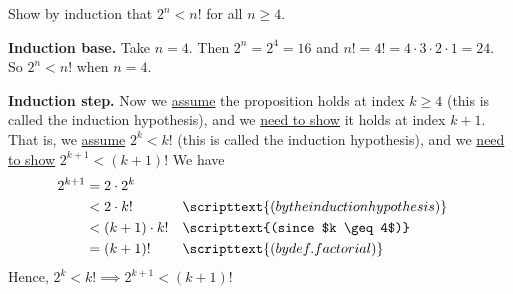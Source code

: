 \documentclass[10pt]{beamer}
\begin{document}
\begin{frame}
\begin{mygreenbox}[title=Exercise 2]
 Show by induction that $2^n < n!$ for all $n \geq 4$.	
\end{mygreenbox}

\vfill \vfill 
\begin{myyellowbox}[title=Solution]
\textbf{Induction base.} Take $n=4$.  Then $2^n = 2^4 = 16$ and $n! = 4! = 4 \cdot 3 \cdot 2 \cdot 1 = 24$. So $2^n < n!$ when $n=4$.

\vspace{0.5cm}

\textbf{Induction step.} Now we \underline{assume} the proposition holds at index $k \geq 4$ (this is called the \alert{induction hypothesis}), and we \underline{need to show} it holds at index $k+1$.  That is, we \underline{assume} $2^k<k!$ (this is called the \alert{induction hypothesis}), and we \underline{need to show} $2^{k+1}<(k+1)!$ We have
%
\begin{align*}
2^{k+1} &= 2 \cdot 2^k \\
&< 2 \cdot k! && \scripttext{(by the induction hypothesis)} \\
&< (k+1) \cdot k! && \scripttext{(since $k \geq 4$)} \\
&= (k+1)! && \scripttext{(by def. factorial)}	
\end{align*}
Hence, $2^k<k! \implies 2^{k+1}<(k+1)!$
\end{myyellowbox}
\end{frame}
\end{document}
